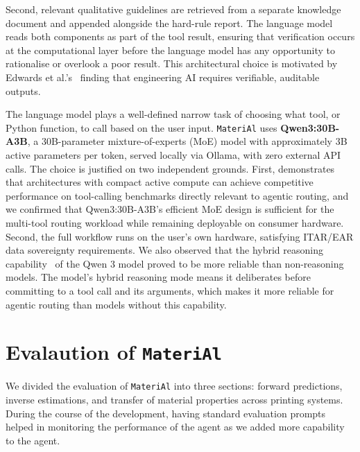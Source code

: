 \documentclass[preprint,review,10pt,number]{elsarticle}
\begin{document}
Second, relevant qualitative guidelines are retrieved from a separate knowledge document and appended alongside the hard-rule report.
The language model reads both components as part of the tool result, ensuring that verification occurs at the computational layer before the language model has any opportunity to rationalise or overlook a poor result.
This architectural choice is motivated by Edwards et al.'s~\citeyearpar{edwards2026agentic} finding that engineering AI requires verifiable, auditable outputs.

The language model plays a well-defined narrow task of choosing what tool, or Python function, to call based on the user input.
\texttt{MateriAl} uses \textbf{Qwen3:30B-A3B}, a 30B-parameter mixture-of-experts (MoE) model with approximately 3B active parameters per token, served locally via Ollama, with zero external API calls. The choice is justified on two independent grounds.
First, \citet{belcak2025slm} demonstrates that architectures with compact active compute can achieve competitive performance on tool-calling benchmarks directly relevant to agentic routing, and we confirmed that Qwen3:30B-A3B's efficient MoE design is sufficient for the multi-tool routing workload while remaining deployable on consumer hardware.
Second, the full workflow runs on the user's own hardware, satisfying ITAR/EAR data sovereignty requirements.
We also observed that the hybrid reasoning capability~\cite{yang2025qwen3} of the Qwen 3 model proved to be more reliable than non-reasoning models.
The model's hybrid reasoning mode means it deliberates before committing to a tool call and its arguments, which makes it more reliable for agentic routing than models without this capability.

\section{Evalaution of \texttt{MateriAl}}

We divided the evaluation of \texttt{MateriAl} into three sections: forward predictions, inverse estimations, and transfer of material properties across printing systems.
During the course of the development, having standard evaluation prompts helped in monitoring the performance of the agent as we added more capability to the agent.

\end{document}
